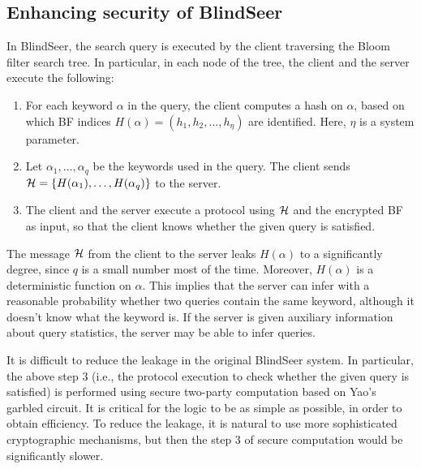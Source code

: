 
\def\HHH{{\cal H}}
\subsection{Enhancing security of BlindSeer}

In BlindSeer, the search query is executed by the client traversing the Bloom filter
search tree. In particular, in each node of the tree, the client and the server
execute the following:

\begin{enumerate}\setlength\itemsep{0em}
\item For each keyword $\alpha$ in the query, the client computes a hash on
$\alpha$, based on which BF indices $H(\alpha) =  (h_1, h_2, ..., h_\eta)$
are identified. Here, $\eta$ is a system parameter. 

\item Let $\alpha_1, \ldots, \alpha_q$ be the keywords used in the query.  The
  client sends $\HHH = \{H(\alpha_1), \ldots, H(\alpha_q)\}$ to the server. 

\item The client and the server execute a protocol using $\HHH$ and the
encrypted BF as input, so that the client knows whether the given query is
satisfied. 
\end{enumerate}

The message $\HHH$ from the client to the server leaks $H(\alpha)$ to
a significantly degree, since $q$ is a small number most of the time. Moreover,
$H(\alpha)$ is a deterministic function on $\alpha$. This implies that
 the server can infer with a reasonable probability whether two queries
contain the same keyword, although it doesn't know what the keyword is.  If the
server is given  auxiliary information about query statistics, the
server may be able to infer queries. 


It is difficult to reduce the leakage in the original
BlindSeer system. In particular, the above step 3 (i.e., the protocol execution
to check whether the given query is satisfied) is performed using secure
two-party computation based on Yao's garbled circuit. It is critical
for the logic to be as simple as possible, in order to obtain efficiency. To
reduce the leakage, it is natural to use more sophisticated cryptographic mechanisms,
but then the step 3 of secure computation would be significantly slower. 

